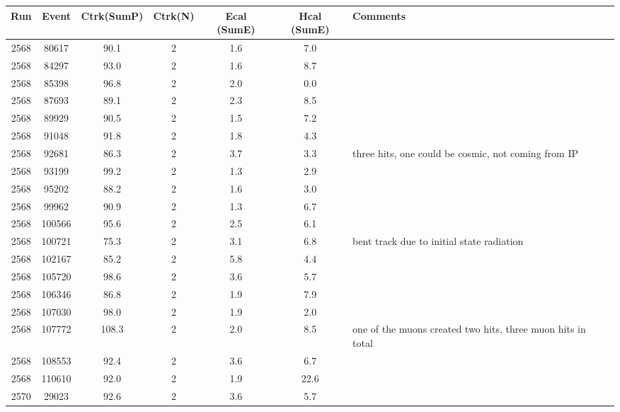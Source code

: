 \begin{tabular}{ccccccl}
	\toprule
	Run & Event & Ctrk(SumP) & Ctrk(N) & Ecal (SumE) & Hcal (SumE) & Comments \\
	\midrule
	2568 & 80617  & 90.1  & 2 & 1.6 & 7.0  &  \\ \midrule
	2568 & 84297  & 93.0  & 2 & 1.6 & 8.7  &  \\
	2568 & 85398  & 96.8  & 2 & 2.0 & 0.0  &  \\
	2568 & 87693  & 89.1  & 2 & 2.3 & 8.5  &  \\
	2568 & 89929  & 90.5  & 2 & 1.5 & 7.2  &  \\
	2568 & 91048  & 91.8  & 2 & 1.8 & 4.3  &  \\
	2568 & 92681  & 86.3  & 2 & 3.7 & 3.3  &  three hits, one could be cosmic, not coming from IP\\
	2568 & 93199  & 99.2  & 2 & 1.3 & 2.9  &  \\
	2568 & 95202  & 88.2  & 2 & 1.6 & 3.0  &  \\
	2568 & 99962  & 90.9  & 2 & 1.3 & 6.7  &  \\
	2568 & 100566 & 95.6  & 2 & 2.5 & 6.1  &  \\
	2568 & 100721 & 75.3  & 2 & 3.1 & 6.8  &  bent track due to initial state radiation \\
	2568 & 102167 & 85.2  & 2 & 5.8 & 4.4  &  \\
	2568 & 105720 & 98.6  & 2 & 3.6 & 5.7  &  \\
	2568 & 106346 & 86.8  & 2 & 1.9 & 7.9  &  \\
	2568 & 107030 & 98.0  & 2 & 1.9 & 2.0  &  \\
	2568 & 107772 & 108.3 & 2 & 2.0 & 8.5  &  one of the muons created two hits, three muon hits in total\\
	2568 & 108553 & 92.4  & 2 & 3.6 & 6.7  &  \\
	2568 & 110610 & 92.0  & 2 & 1.9 & 22.6 &  \\
	2570 & 29023  & 92.6  & 2 & 3.6 & 5.7  &  \\
	\bottomrule
\end{tabular}